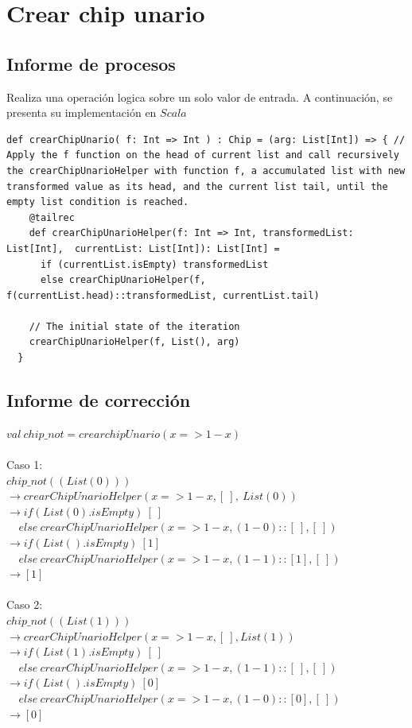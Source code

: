 \documentclass[12pt, a4paper]{article}
\begin{document}
\section{Crear chip unario}
\subsection{Informe de procesos}
Realiza una operación logica sobre un solo valor de entrada. A continuación, se presenta su implementación en $Scala$ \\[16pt]
\begin{lstlisting}[style=scalaStyle, caption=Aplica una operación binaria sobre una valor de entrada.]
  def crearChipUnario( f: Int => Int ) : Chip = (arg: List[Int]) => { // Apply the f function on the head of current list and call recursively the crearChipUnarioHelper with function f, a accumulated list with new transformed value as its head, and the current list tail, until the empty list condition is reached.
    @tailrec
    def crearChipUnarioHelper(f: Int => Int, transformedList: List[Int],  currentList: List[Int]): List[Int] =
      if (currentList.isEmpty) transformedList
      else crearChipUnarioHelper(f, f(currentList.head)::transformedList, currentList.tail)

    // The initial state of the iteration
    crearChipUnarioHelper(f, List(), arg)
  }
\end{lstlisting}
\subsection{Informe de corrección}
$val~chip\_not = crearchipUnario(x => 1- x)$ \\ \\
Caso 1: \\ 
$chip\_not((List(0)))$ \\
$\rightarrow crearChipUnarioHelper(x => 1 - x, [~], ~List(0))$ \\
$\rightarrow if (List(0).isEmpty)~[~] $ \\
$~~~~~else~crearChipUnarioHelper(x => 1 - x, (1 - 0)::[~], [~])$ \\
$\rightarrow if (List().isEmpty)~[1] $ \\
$~~~~~else~crearChipUnarioHelper(x => 1 - x, (1 - 1)::[1], [~])$ \\
$\rightarrow [1]$ \\ \\
Caso 2: \\ 
$chip\_not((List(1)))$ \\
$\rightarrow crearChipUnarioHelper(x => 1- x, [~], List(1))$ \\
$\rightarrow if (List(1).isEmpty)~[~] $ \\
$~~~~~else~crearChipUnarioHelper(x => 1 - x, (1 - 1)::[~], [~])$ \\
$\rightarrow if (List().isEmpty)~[0] $ \\
$~~~~~else~crearChipUnarioHelper(x => 1 - x, (1 - 0)::[0], [~])$ \\
$\rightarrow [0]$ \\ \\
\end{document}
